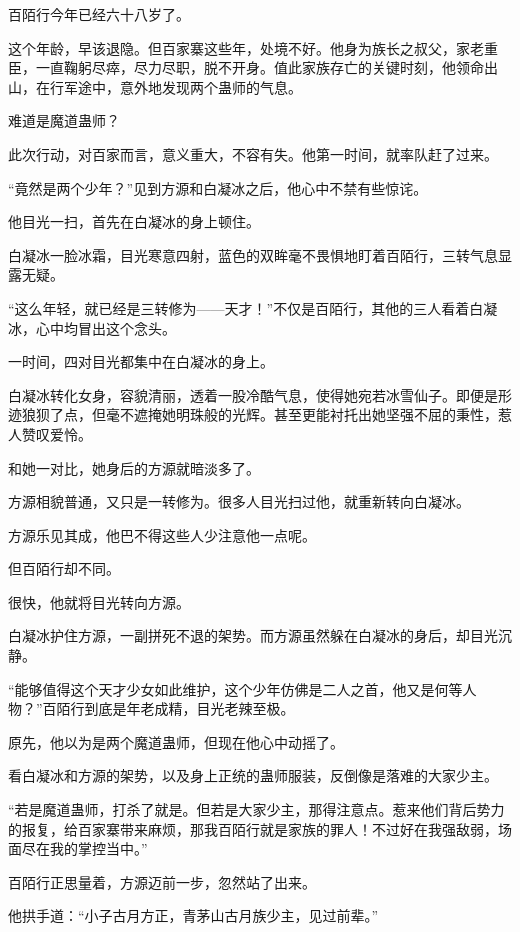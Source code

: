 
\begin{this_body}

百陌行今年已经六十八岁了。

这个年龄，早该退隐。但百家寨这些年，处境不好。他身为族长之叔父，家老重臣，一直鞠躬尽瘁，尽力尽职，脱不开身。值此家族存亡的关键时刻，他领命出山，在行军途中，意外地发现两个蛊师的气息。

难道是魔道蛊师？

此次行动，对百家而言，意义重大，不容有失。他第一时间，就率队赶了过来。

“竟然是两个少年？”见到方源和白凝冰之后，他心中不禁有些惊诧。

他目光一扫，首先在白凝冰的身上顿住。

白凝冰一脸冰霜，目光寒意四射，蓝色的双眸毫不畏惧地盯着百陌行，三转气息显露无疑。

“这么年轻，就已经是三转修为——天才！”不仅是百陌行，其他的三人看着白凝冰，心中均冒出这个念头。

一时间，四对目光都集中在白凝冰的身上。

白凝冰转化女身，容貌清丽，透着一股冷酷气息，使得她宛若冰雪仙子。即便是形迹狼狈了点，但毫不遮掩她明珠般的光辉。甚至更能衬托出她坚强不屈的秉性，惹人赞叹爱怜。

和她一对比，她身后的方源就暗淡多了。

方源相貌普通，又只是一转修为。很多人目光扫过他，就重新转向白凝冰。

方源乐见其成，他巴不得这些人少注意他一点呢。

但百陌行却不同。

很快，他就将目光转向方源。

白凝冰护住方源，一副拼死不退的架势。而方源虽然躲在白凝冰的身后，却目光沉静。

“能够值得这个天才少女如此维护，这个少年仿佛是二人之首，他又是何等人物？”百陌行到底是年老成精，目光老辣至极。

原先，他以为是两个魔道蛊师，但现在他心中动摇了。

看白凝冰和方源的架势，以及身上正统的蛊师服装，反倒像是落难的大家少主。

“若是魔道蛊师，打杀了就是。但若是大家少主，那得注意点。惹来他们背后势力的报复，给百家寨带来麻烦，那我百陌行就是家族的罪人！不过好在我强敌弱，场面尽在我的掌控当中。”

百陌行正思量着，方源迈前一步，忽然站了出来。

他拱手道：“小子古月方正，青茅山古月族少主，见过前辈。”


\end{this_body}

